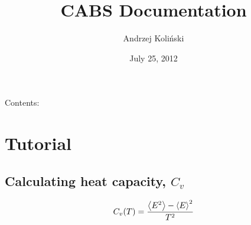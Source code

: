 \documentclass[letterpaper,10pt,english]{sphinxmanual}
\title{CABS Documentation}
\date{July 25, 2012}
\author{Andrzej Koliński}
\begin{document}
\maketitle
\tableofcontents
{}\label{index::doc}


Contents:


\chapter{Tutorial}
\label{tutorial::doc}\label{tutorial:welcome-to-cabs-s-documentation}\label{tutorial:tutorial}

\section{Calculating heat capacity, $C_v$}
\label{tutorial:calculating-heat-capacity}\begin{gather}
\begin{split}C_v(T) = \frac{\left<E^2\right> - \left<E\right>^2}{T^2}\end{split}\notag\\\begin{split}\end{split}\notag
\end{gather}
\end{document}
